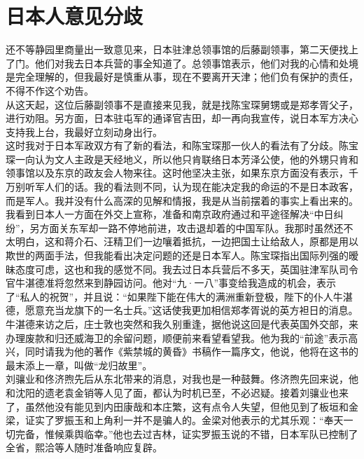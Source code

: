 \fancyhead[RO]{} %
\fancyhead[LE]{} %
\chapter*{日本人意见分歧}
\thispagestyle{empty}
还不等静园里商量出一致意见来，日本驻津总领事馆的后藤副领事，第二天便找上了门。他们对我去日本兵营的事全知道了。总领事馆表示，他们对我的心情和处境是完全理解的，但我最好是慎重从事，现在不要离开天津；他们负有保护的责任，不得不作这个劝告。\\

从这天起，这位后藤副领事不是直接来见我，就是找陈宝琛舅甥或是郑孝胥父子，进行劝阻。另方面，日本驻屯军的通译官吉田，却一再向我宣传，说日本军方决心支持我上台，我最好立刻动身出行。\\

这时我对于日本军政双方有了新的看法，和陈宝琛那一伙人的看法有了分歧。陈宝琛一向认为文人主政是天经地义，所以他只肯联络日本芳泽公使，他的外甥只肯和领事馆以及东京的政友会人物来往。这时他坚决主张，如果东京方面没有表示，千万别听军人们的话。我的看法则不同，认为现在能决定我的命运的不是日本政客，而是军人。我并没有什么高深的见解和情报，我是从当前摆着的事实上看出来的。我看到日本人一方面在外交上宣称，准备和南京政府通过和平途径解决“中日纠纷”，另方面关东军却一路不停地前进，攻击退却着的中国军队。我那时虽然还不太明白，这和蒋介石、汪精卫们一边嚷着抵抗，一边把国土让给敌人，原都是用以欺世的两面手法，但我能看出决定问题的还是日本军人。陈宝琛指出国际列强的暧昧态度可虑，这也和我的感觉不同。我去过日本兵营后不多天，英国驻津军队司令官牛湛德准将忽然来到静园访问。他对“九·一八”事变给我造成的机会，表示了“私人的祝贺”，并且说：“如果陛下能在伟大的满洲重新登极，陛下的仆人牛湛德，愿意充当龙旗下的一名士兵。”这话使我更加相信郑孝胥说的英方袒日的消息。牛湛德来访之后，庄士敦也突然和我久别重逢，据他说这回是代表英国外交部，来办理废款和归还威海卫的余留问题，顺便前来看望看望我。他为我的“前途”表示高兴，同时请我为他的著作《紫禁城的黄昏》书稿作一篇序文，他说，他将在这书的最末添上一章，叫做“龙归故里”。\\

刘骧业和佟济煦先后从东北带来的消息，对我也是一种鼓舞。佟济煦先回来说，他和沈阳的遗老袁金销等人见了面，都认为时机已至，不必迟疑。接着刘骧业也来了，虽然他没有能见到内田康哉和本庄繁，这有点令人失望，但他见到了板垣和金梁，证实了罗振玉和上角利一并不是骗人的。金梁对他表示的尤其乐观：“奉天一切完备，惟候乘舆临幸。”他也去过吉林，证实罗振玉说的不错，日本军队已控制了全省，熙洽等人随时准备响应复辟。\\

